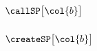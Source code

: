 \subsubsection{$\callSP\big[\col{b}\big]$                                                         \lispDone{}}  \label{hub: stack patterns: call}             
\subsubsection{$\createSP\big[\col{b}\big]$                                                       \lispDone{}}  \label{hub: stack patterns: create}           
